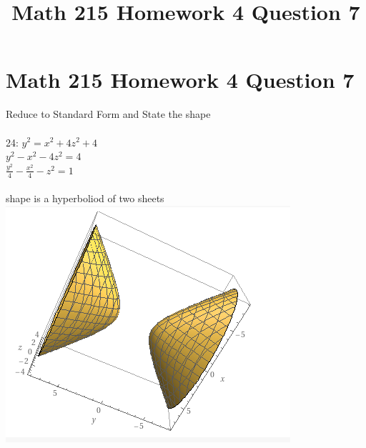 \documentclass{article}
\title{Math 215 Homework 4 Question 7}
\begin{document}
\section{Math 215 Homework 4 Question 7}


Reduce to Standard Form and State the shape \\ \\
24: $y^2 = x^2 + 4z^2 + 4$\\ 
$ y^2 - x^2 - 4z^2 = 4$ \\
$ \frac{y^2}{4} - \frac{x^2}{4} - z^2 = 1$ \\ \\
shape is a hyperboliod of two sheets 
\\
\includegraphics{hyperbaloid of two sheets.png}
\end{document}
